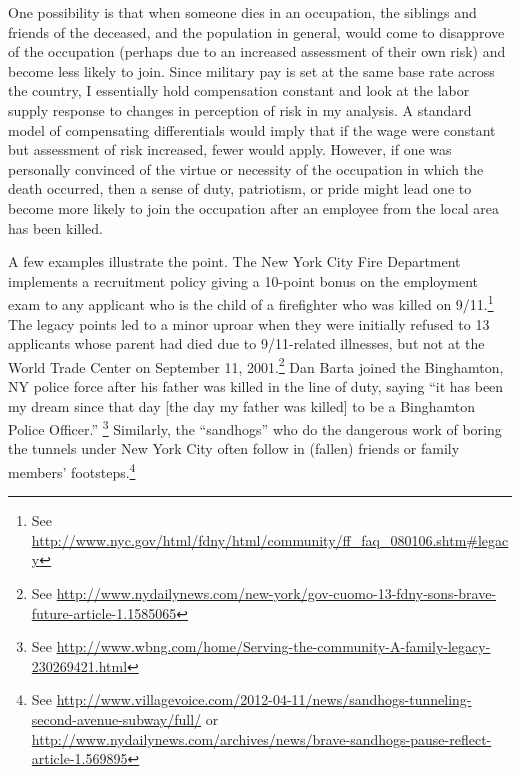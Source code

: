 \documentclass[12pt] {article}
\begin{document}
One possibility is that when someone dies in an occupation, the siblings and friends of the deceased, and the population in general, would come to disapprove of the occupation (perhaps due to an increased assessment of their own risk) and become less likely to join. Since military pay is set at the same base rate across the country, I essentially hold compensation constant and look at the labor supply response to changes in perception of risk in my analysis. A standard model of compensating differentials would imply that if the wage were constant but assessment of risk increased, fewer would apply. However, if one was personally convinced of the virtue or necessity of the occupation in which the death occurred, then a sense of duty, patriotism, or pride might lead one to become more likely to join the occupation after an employee from the local area has been killed.  

A few examples illustrate the point.  The New York City Fire Department implements a recruitment policy giving a  10-point bonus on the employment exam to any applicant who is the child of a firefighter who was killed on 9/11.\footnote {See \url{http://www.nyc.gov/html/fdny/html/community/ff_faq_080106.shtm\#legacy}} The legacy points led to a minor uproar when they were initially refused to 13 applicants whose parent had died due to 9/11-related illnesses, but not at the World Trade Center on September 11, 2001.\footnote{See \url{http://www.nydailynews.com/new-york/gov-cuomo-13-fdny-sons-brave-future-article-1.1585065}} Dan Barta joined the Binghamton, NY police force after his father was killed in the line of duty, saying ``it has been my dream since that day [the day my father was killed] to be a Binghamton Police Officer.'' 
\footnote{See \url{http://www.wbng.com/home/Serving-the-community-A-family-legacy-230269421.html}} Similarly, the ``sandhogs'' who do the dangerous work of boring the tunnels under New York City often follow in (fallen) friends or family members' footsteps.\footnote{See \url{http://www.villagevoice.com/2012-04-11/news/sandhogs-tunneling-second-avenue-subway/full/} or \url{http://www.nydailynews.com/archives/news/brave-sandhogs-pause-reflect-article-1.569895}} 
\end{document}
